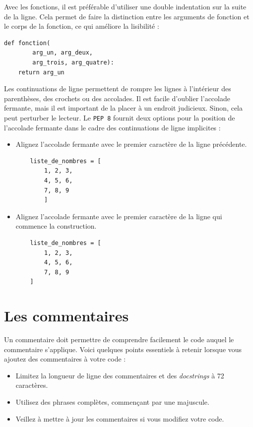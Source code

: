 \documentclass[a4paper,11pt]{book}
\begin{document}
Avec les fonctions, il est préférable d'utiliser une double indentation sur la suite de la ligne. Cela permet de faire la distinction entre les arguments de fonction et le corps de la fonction, ce qui améliore la lisibilité :
\begin{lstlisting}
def fonction(
        arg_un, arg_deux,
        arg_trois, arg_quatre):
    return arg_un
\end{lstlisting}
\medskip

Les continuations de ligne permettent de rompre les lignes à l'intérieur des parenthèses, des crochets ou des accolades. Il est facile d'oublier l'accolade fermante, mais il est important de la placer à un endroit judicieux. Sinon, cela peut perturber le lecteur. Le \texttt{PEP 8} fournit deux options pour la position de l'accolade fermante dans le cadre des continuations de ligne implicites :
\begin{itemize}
	\item Alignez l'accolade fermante avec le premier caractère de la ligne précédente.
	\begin{lstlisting}
	liste_de_nombres = [
        1, 2, 3,
        4, 5, 6,
        7, 8, 9
        ]
	\end{lstlisting}
	\item Alignez l'accolade fermante avec le premier caractère de la ligne qui commence la construction.
	\begin{lstlisting}
	liste_de_nombres = [
        1, 2, 3,
        4, 5, 6,
        7, 8, 9
    ]
	\end{lstlisting}
\end{itemize}
\medskip

\section{Les commentaires}
Un commentaire doit permettre de comprendre facilement le code auquel le commentaire s'applique. Voici quelques points essentiels à retenir lorsque vous ajoutez des commentaires à votre code :
\begin{itemize}
	\item Limitez la longueur de ligne des commentaires et des \textit{docstrings} à 72 caractères.
    \item Utilisez des phrases complètes, commençant par une majuscule.
    \item Veillez à mettre à jour les commentaires si vous modifiez votre code.
\end{itemize}
\medskip
\end{document}
